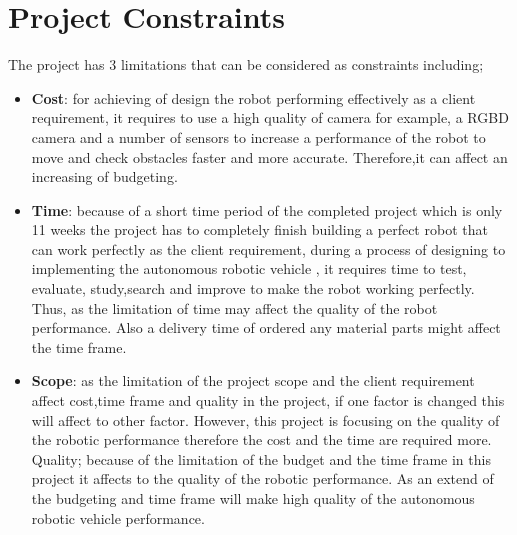 \documentclass[a4paper]{article}
\begin{document}
\section{Project Constraints}
The project has 3 limitations that can be considered as constraints including;
\begin{itemize}
\item \textbf{Cost}: for achieving of design the robot performing effectively as a client requirement, it requires to use a high quality of camera for example, a RGBD camera and a number of sensors to increase a performance of the robot to move and check obstacles faster and more accurate. Therefore,it can affect an increasing of budgeting.
\item \textbf{Time}: because of a short time period of the completed project which is only 11 weeks the project has to completely finish building a perfect robot that can work perfectly as the client requirement, during a process of designing to implementing the autonomous robotic vehicle , it requires time to test, evaluate, study,search and improve to make the robot working perfectly. Thus, as the limitation of time may affect the quality of the robot performance. Also a delivery time of ordered any material parts might affect the time frame.
\item \textbf{Scope}: as the limitation of the project scope and the client requirement affect cost,time frame and quality in the project, if one factor is changed this will affect to other factor. However, this project is focusing on the quality of the robotic performance  therefore the cost and the time are required more.
Quality; because of the limitation of the budget and the time frame in this project it affects to the quality of the robotic performance. As an extend of the budgeting and time frame will make high quality of the autonomous robotic vehicle performance.
\end{itemize}

\end{document}
